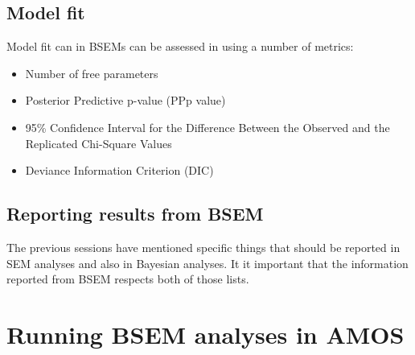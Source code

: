 \documentclass[
  a4paper,
  DIV=11,
  numbers=noendperiod]{scrreprt}
\providecommand{\tightlist}{%
  \setlength{\itemsep}{0pt}\setlength{\parskip}{0pt}}\usepackage{longtable,booktabs,array}
\begin{document}
\section{Model fit}\label{model-fit}

Model fit can in BSEMs can be assessed in using a number of metrics:

\begin{itemize}
\tightlist
\item
  Number of free parameters
\item
  Posterior Predictive p-value (PPp value)
\item
  95\% Confidence Interval for the Difference Between the Observed and
  the Replicated Chi-Square Values
\item
  Deviance Information Criterion (DIC)
\end{itemize}

\section{Reporting results from BSEM}\label{reporting-results-from-bsem}

The previous sessions have mentioned specific things that should be
reported in SEM analyses and also in Bayesian analyses. It it important
that the information reported from BSEM respects both of those lists.


\chapter{Running BSEM analyses in
AMOS}\label{running-bsem-analyses-in-amos}
\end{document}
